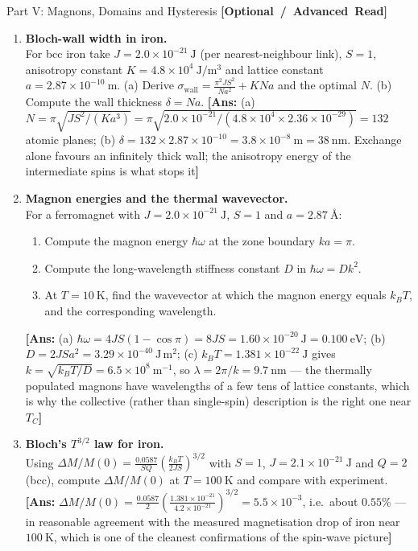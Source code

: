 \documentclass[11pt,a4paper]{article}
\newcommand{\extratag}{\hfill\mbox{\normalfont\footnotesize\sffamily\color{secondary}\textbf{[Optional / Advanced Read]}}}
\newcommand{\Ang}{\text{\AA}}
\begin{document}
\begin{assignmentbox}{Part V: Magnons, Domains and Hysteresis \extratag}
\begin{enumerate}[label=\textbf{V.\arabic*.}, leftmargin=*]
    \item \textbf{Bloch-wall width in iron.}\\
    For bcc iron take $J = 2.0\times10^{-21}\ \mathrm{J}$ (per nearest-neighbour link), $S = 1$, anisotropy constant $K = 4.8\times10^{4}\ \mathrm{J/m^3}$ and lattice constant $a = 2.87\times10^{-10}\ \mathrm{m}$. (a) Derive $\sigma_{\mathrm{wall}} = \frac{\pi^2JS^2}{Na^2} + KNa$ and the optimal $N$. (b) Compute the wall thickness $\delta = Na$.
    \textbf{[Ans:} (a) $N = \pi\sqrt{JS^2/(Ka^3)} = \pi\sqrt{2.0\times10^{-21}/(4.8\times10^{4}\times2.36\times10^{-29})} = 132$ atomic planes; (b) $\delta = 132\times2.87\times10^{-10} = 3.8\times10^{-8}\ \mathrm{m} = 38\ \mathrm{nm}$. Exchange alone favours an infinitely thick wall; the anisotropy energy of the intermediate spins is what stops it\textbf{]}

    \item \textbf{Magnon energies and the thermal wavevector.}\\
    For a ferromagnet with $J = 2.0\times10^{-21}\ \mathrm{J}$, $S = 1$ and $a = 2.87\ \Ang$:
    \begin{enumerate}[label=(\alph*)]
        \item Compute the magnon energy $\hbar\omega$ at the zone boundary $ka = \pi$.
        \item Compute the long-wavelength stiffness constant $D$ in $\hbar\omega = Dk^2$.
        \item At $T = 10\ \mathrm{K}$, find the wavevector at which the magnon energy equals $k_BT$, and the corresponding wavelength.
    \end{enumerate}
    \textbf{[Ans:} (a) $\hbar\omega = 4JS(1-\cos\pi) = 8JS = 1.60\times10^{-20}\ \mathrm{J} = 0.100\ \mathrm{eV}$; (b) $D = 2JSa^2 = 3.29\times10^{-40}\ \mathrm{J\,m^2}$; (c) $k_BT = 1.381\times10^{-22}\ \mathrm{J}$ gives $k = \sqrt{k_BT/D} = 6.5\times10^{8}\ \mathrm{m^{-1}}$, so $\lambda = 2\pi/k = 9.7\ \mathrm{nm}$ --- the thermally populated magnons have wavelengths of a few tens of lattice constants, which is why the collective (rather than single-spin) description is the right one near $T_C$\textbf{]}

    \item \textbf{Bloch's $T^{3/2}$ law for iron.}\\
    Using $\Delta M/M(0) = \frac{0.0587}{SQ}\left(\frac{k_BT}{2JS}\right)^{3/2}$ with $S = 1$, $J = 2.1\times10^{-21}\ \mathrm{J}$ and $Q = 2$ (bcc), compute $\Delta M/M(0)$ at $T = 100\ \mathrm{K}$ and compare with experiment.
    \textbf{[Ans:} $\Delta M/M(0) = \frac{0.0587}{2}\left(\frac{1.381\times10^{-21}}{4.2\times10^{-21}}\right)^{3/2} = 5.5\times10^{-3}$, i.e.\ about $0.55\%$ --- in reasonable agreement with the measured magnetisation drop of iron near $100\ \mathrm{K}$, which is one of the cleanest confirmations of the spin-wave picture\textbf{]}


\end{enumerate}
\end{assignmentbox}
\end{document}
